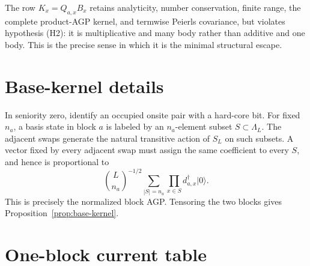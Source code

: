 \documentclass[11pt]{article}
\theoremstyle{definition}
\theoremstyle{remark}
\newcommand{\ket}[1]{\lvert #1\rangle}
\begin{document}
The row $K_x=Q_{a,x}B_x$ retains analyticity, number conservation, finite range, the complete product-AGP kernel, and termwise Peierls covariance, but violates hypothesis (H2): it is multiplicative and many body rather than additive and one body.  This is the precise sense in which it is the minimal structural escape.

\section{Base-kernel details}
\label{app:base-kernel}

In seniority zero, identify an occupied onsite pair with a hard-core bit.  For fixed $n_a$, a basis state in block $a$ is labeled by an $n_a$-element subset $S\subset\Lambda_L$.  The adjacent swaps generate the natural transitive action of $S_L$ on such subsets.  A vector fixed by every adjacent swap must assign the same coefficient to every $S$, and hence is proportional to
\begin{equation}
 \binom{L}{n_a}^{-1/2}\sum_{|S|=n_a}\prod_{x\in S}d_{a,x}^\dagger\ket0.
\end{equation}
This is precisely the normalized block AGP.  Tensoring the two blocks gives Proposition~\ref{prop:base-kernel}.


\section{One-block current table}
\label{app:current-table}
\end{document}
